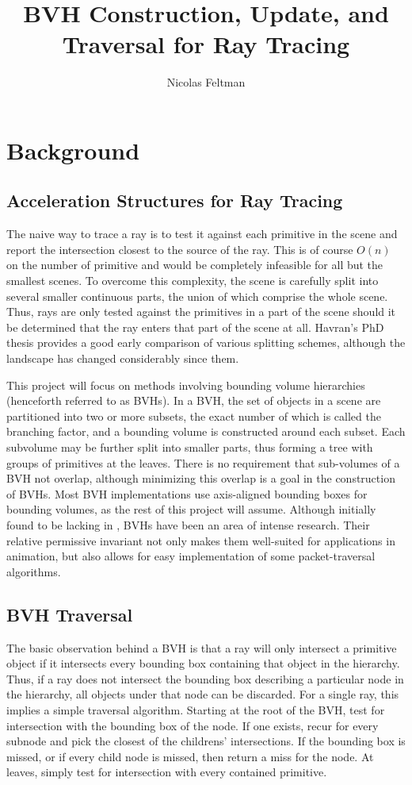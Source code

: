 \documentclass[twocolumn]{article}
\title{BVH Construction, Update, and Traversal for Ray Tracing}
\author{Nicolas Feltman}
\begin{document}
\maketitle
\section{Background}
\subsection{Acceleration Structures for Ray Tracing}
The naive way to trace a ray is to test it against each primitive in the scene and report the intersection closest to the source of the ray.  This is of course $O(n)$ on the number of primitive and would be completely infeasible for all but the smallest scenes.   To overcome this complexity, the scene is carefully split into several smaller continuous parts, the union of which comprise the whole scene.  Thus, rays are only tested against the primitives in a part of the scene should it be determined that the ray enters that part of the scene at all.  Havran's PhD thesis \cite{Havran00} provides a good early comparison of various splitting schemes, although the landscape has changed considerably since them.  

This project will focus on methods involving bounding volume hierarchies (henceforth referred to as BVHs).  In a BVH, the set of objects in a scene are partitioned into two or more subsets, the exact number of which is called the branching factor, and a bounding volume is constructed around each subset.  Each subvolume may be further split into smaller parts, thus forming a tree with groups of primitives at the leaves. There is no requirement that sub-volumes of a BVH not overlap, although minimizing this overlap is a goal in the construction of BVHs.  Most  BVH implementations use axis-aligned bounding boxes for bounding volumes, as the rest of this project will assume.  Although initially found to be lacking in \cite{Havran00}, BVHs have been an area of intense research.  Their relative permissive invariant not only makes them well-suited for applications in animation, but also allows for easy implementation of some packet-traversal algorithms\cite{Wald07}.  

\subsection{BVH Traversal}

The basic observation behind a BVH is that a ray will only intersect a primitive object if it intersects every bounding box containing that object in the hierarchy.  Thus, if a ray does not intersect the bounding box describing a particular node in the hierarchy, all objects under that node can be discarded.  For a single ray, this implies a simple traversal algorithm.  Starting at the root of the BVH, test for intersection with the bounding box of the node.  If one exists, recur for every subnode and pick the closest of the childrens' intersections.  If the bounding box is missed, or if every child node is missed, then return a miss for the node.  At leaves, simply test for intersection with every contained primitive.  
\end{document}
